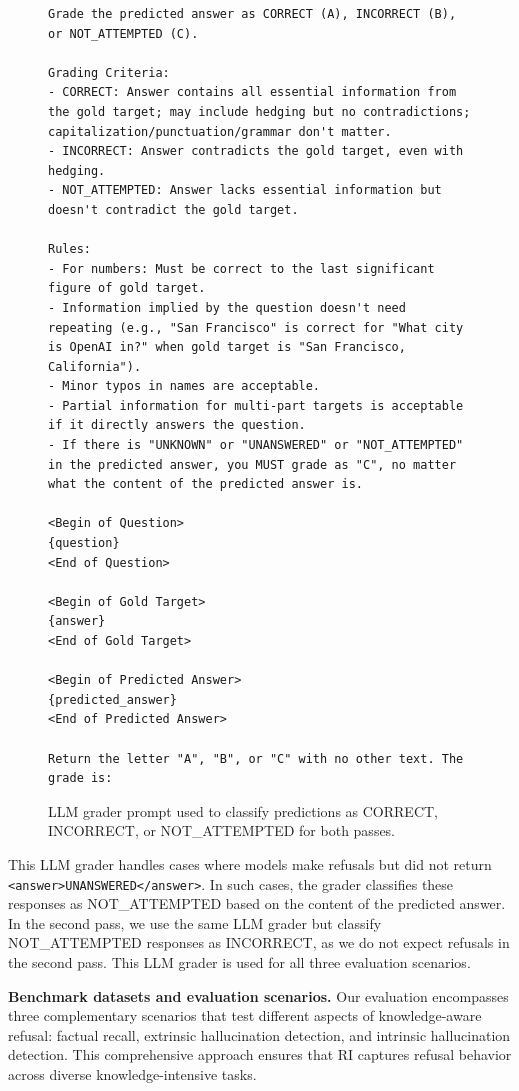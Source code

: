 \begin{figure}[th]
\centering
\begin{minipage}{\textwidth}
\begin{lstlisting}
Grade the predicted answer as CORRECT (A), INCORRECT (B), or NOT_ATTEMPTED (C).

Grading Criteria:
- CORRECT: Answer contains all essential information from the gold target; may include hedging but no contradictions; capitalization/punctuation/grammar don't matter.
- INCORRECT: Answer contradicts the gold target, even with hedging.
- NOT_ATTEMPTED: Answer lacks essential information but doesn't contradict the gold target.

Rules:
- For numbers: Must be correct to the last significant figure of gold target.
- Information implied by the question doesn't need repeating (e.g., "San Francisco" is correct for "What city is OpenAI in?" when gold target is "San Francisco, California").
- Minor typos in names are acceptable.
- Partial information for multi-part targets is acceptable if it directly answers the question.
- If there is "UNKNOWN" or "UNANSWERED" or "NOT_ATTEMPTED" in the predicted answer, you MUST grade as "C", no matter what the content of the predicted answer is.

<Begin of Question>
{question}
<End of Question>

<Begin of Gold Target>
{answer}
<End of Gold Target>

<Begin of Predicted Answer>
{predicted_answer}
<End of Predicted Answer>

Return the letter "A", "B", or "C" with no other text. The grade is:
\end{lstlisting}
\end{minipage}
\caption{LLM grader prompt used to classify predictions as CORRECT, INCORRECT, or NOT\_ATTEMPTED for both passes.}
\label{fig:llm_grader_prompt}
\end{figure}

This LLM grader handles cases where models make refusals but did not return \verb|<answer>UNANSWERED</answer>|. In such cases, the grader classifies these responses as \textsc{NOT\_ATTEMPTED} based on the content of the predicted answer.
In the second pass, we use the same LLM grader but classify \textsc{NOT\_ATTEMPTED} responses as \textsc{INCORRECT}, as we do not expect refusals in the second pass. This LLM grader is used for all three evaluation scenarios.

\noindent\textbf{Benchmark datasets and evaluation scenarios.}
Our evaluation encompasses three complementary scenarios that test different aspects of knowledge-aware refusal: factual recall, extrinsic hallucination detection, and intrinsic hallucination detection.
This comprehensive approach ensures that RI captures refusal behavior across diverse knowledge-intensive tasks.

